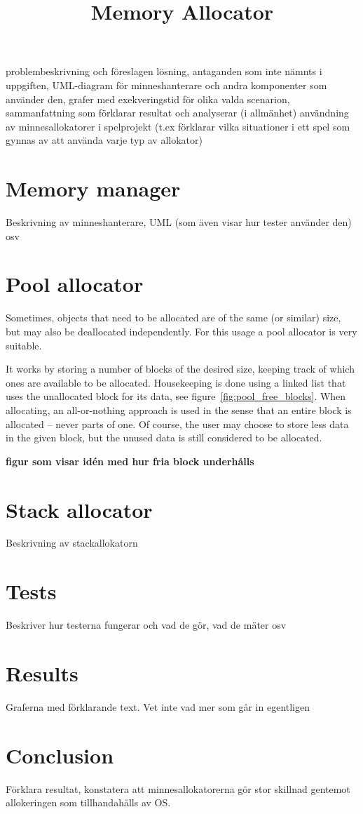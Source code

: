 \documentclass{article}
\title{Memory Allocator}
\begin{document}
\maketitle
\thispagestyle{empty}
\newpage

\tableofcontents
\thispagestyle{empty}
\newpage

\setcounter{page}{1}

problembeskrivning och föreslagen lösning, antaganden som inte nämnts i uppgiften, UML-diagram för minneshanterare och andra komponenter som använder den, grafer med exekveringstid för olika valda scenarion, sammanfattning som förklarar resultat och analyserar (i allmänhet) användning av minnesallokatorer i spelprojekt (t.ex förklarar vilka situationer i ett spel som gynnas av att använda varje typ av allokator)

\section{Memory manager}
Beskrivning av minneshanterare, UML (som även visar hur tester använder den) osv

\section{Pool allocator}
Sometimes, objects that need to be allocated are of the same (or similar) size, but may also be deallocated independently. For this usage a pool allocator is very suitable.

It works by storing a number of blocks of the desired size, keeping track of which ones are available to be allocated. Housekeeping is done using a linked list that uses the unallocated block for its data, see figure~\ref{fig:pool_free_blocks}. When allocating, an all-or-nothing approach is used in the sense that an entire block is allocated -- never parts of one. Of course, the user may choose to store less data in the given block, but the unused data is still considered to be allocated.

\textbf{figur som visar idén med hur fria block underhålls}

\section{Stack allocator}
Beskrivning av stackallokatorn

\section{Tests}
Beskriver hur testerna fungerar och vad de gör, vad de mäter osv

\section{Results}
Graferna med förklarande text. Vet inte vad mer som går in egentligen

\section{Conclusion}
Förklara resultat, konstatera att minnesallokatorerna gör stor skillnad gentemot allokeringen som tillhandahålls av OS.
\end{document}

